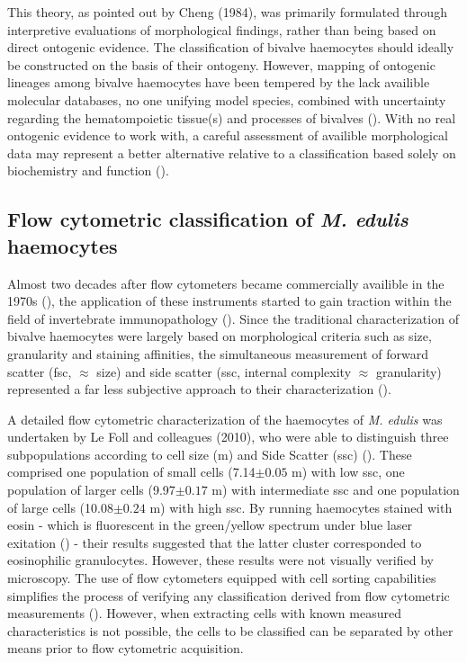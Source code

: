 This theory, as pointed out by Cheng (1984), was primarily formulated through interpretive evaluations of morphological findings, rather than being based on direct ontogenic evidence. The classification of bivalve haemocytes should ideally be constructed on the basis of their ontogeny. However, mapping of ontogenic lineages among bivalve haemocytes have been tempered by the lack availible molecular databases, no one unifying model species, combined with uncertainty regarding the hematompoietic tissue(s) and processes of bivalves (\cite{Hine1999, Smith2016, Pila2016, delaBallina2022}). With no real ontogenic evidence to work with, a careful assessment of availible morphological data may represent a better alternative relative to a classification based solely on biochemistry and function (\cite{Hine1999}). 

\subsection{Flow cytometric classification of \emph{M. edulis} haemocytes}
Almost two decades after flow cytometers became commercially availible in the 1970s (\cite{Shapiro2004}), the application of these instruments started to gain traction within the field of invertebrate immunopathology (\cite{Fisher1988}). Since the traditional characterization of bivalve haemocytes were largely based on morphological criteria such as size, granularity and staining affinities, the simultaneous measurement of forward scatter (\acrshort{fsc}, $\approx$ size) and side scatter (\acrshort{ssc}, internal complexity $\approx$ granularity) represented a far less subjective approach to their characterization (\cite{AshtonAlcox1998, Allam2002, Mateo2009}).

A detailed flow cytometric characterization of the haemocytes of \emph{M. edulis} was undertaken by Le Foll and colleagues (2010), who were able to distinguish three subpopulations according to cell size (\micro m) and Side Scatter (\acrshort{ssc}) (\cite{LeFoll2010}). These comprised one population of small cells (7.14$\pm{0.05}$ \micro m) with low \acrshort{ssc}, one population of larger cells (9.97$\pm{0.17}$ \micro m) with intermediate \acrshort{ssc} and one population of large cells (10.08$\pm{0.24}$ \micro m) with high \acrshort{ssc}. By running haemocytes stained with eosin - which is fluorescent in the green/yellow spectrum under blue laser exitation (\cite{Elfer2016, Koegle2020}) - their results suggested that the latter cluster corresponded to eosinophilic granulocytes. However, these results were not visually verified by microscopy. The use of flow cytometers equipped with cell sorting capabilities simplifies the process of verifying any classification derived from flow cytometric measurements (\cite{Shapiro2004}). However, when extracting cells with known measured characteristics is not possible, the cells to be classified can be separated by other means prior to flow cytometric acquisition.

